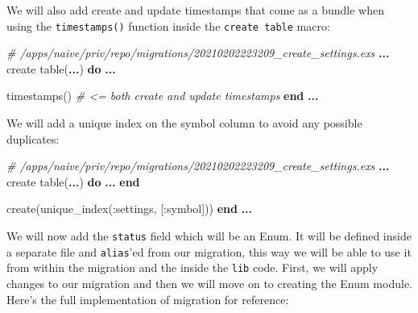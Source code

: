 \documentclass[
]{book}
\newenvironment{Shaded}{\begin{snugshade}}{\end{snugshade}}
\newcommand{\CommentTok}[1]{\textcolor[rgb]{0.56,0.35,0.01}{\textit{#1}}}
\newcommand{\KeywordTok}[1]{\textcolor[rgb]{0.13,0.29,0.53}{\textbf{#1}}}
\newcommand{\NormalTok}[1]{#1}
\newcommand{\OperatorTok}[1]{\textcolor[rgb]{0.81,0.36,0.00}{\textbf{#1}}}
\newcommand{\VariableTok}[1]{\textcolor[rgb]{0.00,0.00,0.00}{#1}}
\begin{document}
We will also add create and update timestamps that come as a bundle when using the \texttt{timestamps()} function inside the \texttt{create\ table} macro:

\begin{Shaded}
\begin{Highlighting}[]
\CommentTok{\# /apps/naive/priv/repo/migrations/20210202223209\_create\_settings.exs}
\OperatorTok{...}
\NormalTok{    create table(}\OperatorTok{...}\NormalTok{) }\KeywordTok{do}
      \OperatorTok{...}

\NormalTok{      timestamps() }\CommentTok{\# \textless{}= both create and update timestamps}
    \KeywordTok{end}
    \OperatorTok{...}
\end{Highlighting}
\end{Shaded}

We will add a unique index on the symbol column to avoid any possible duplicates:

\begin{Shaded}
\begin{Highlighting}[]
\CommentTok{\# /apps/naive/priv/repo/migrations/20210202223209\_create\_settings.exs}
\OperatorTok{...}
\NormalTok{    create table(}\OperatorTok{...}\NormalTok{) }\KeywordTok{do}
      \OperatorTok{...}
    \KeywordTok{end}

\NormalTok{    create(unique\_index(}\VariableTok{:settings}\NormalTok{, [}\VariableTok{:symbol}\NormalTok{]))}
  \KeywordTok{end}
\OperatorTok{...}
\end{Highlighting}
\end{Shaded}

We will now add the \texttt{status} field which will be an Enum. It will be defined inside a separate file and \texttt{alias}'ed from our migration, this way we will be able to use it from within the migration and the inside the \texttt{lib} code. First, we will apply changes to our migration and then we will move on to creating the Enum module.
Here's the full implementation of migration for reference:
\end{document}
